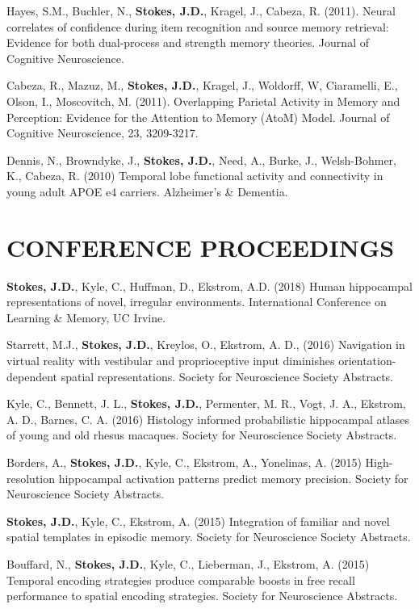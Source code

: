 \documentclass[line,margin,10pt]{res}
\begin{document}
\begin{resume}
Hayes, S.M., Buchler, N., \textbf{Stokes, J.D.}, Kragel, J., Cabeza, R. (2011). Neural correlates of confidence during item recognition and source memory retrieval: Evidence for both dual-process and strength memory theories. Journal of Cognitive Neuroscience.
	
Cabeza, R., Mazuz, M., \textbf{Stokes, J.D.}, Kragel, J., Woldorff, W, Ciaramelli, E., Olson, I., Moscovitch, M. (2011). Overlapping Parietal Activity in Memory and Perception: Evidence for the Attention to Memory (AtoM) Model. Journal of Cognitive Neuroscience, 23, 3209-3217.
	
Dennis, N., Browndyke, J., \textbf{Stokes, J.D.}, Need, A., Burke, J., Welsh-Bohmer, K., Cabeza, R. (2010) Temporal lobe functional activity and connectivity in young adult APOE e4 carriers. Alzheimer's \& Dementia.

\section{CONFERENCE PROCEEDINGS} 

\textbf{Stokes, J.D.}, Kyle, C., Huffman, D., Ekstrom, A.D. (2018) Human hippocampal representations of novel, irregular environments. International Conference on Learning \& Memory, UC Irvine.

Starrett, M.J., \textbf{Stokes, J.D.}, Kreylos, O., Ekstrom, A. D., (2016) Navigation in virtual reality with vestibular and proprioceptive input diminishes orientation-dependent spatial representations. Society for Neuroscience Society Abstracts.

Kyle, C., Bennett, J. L., \textbf{Stokes, J.D.}, Permenter, M. R., Vogt, J. A., Ekstrom, A. D., Barnes, C. A. (2016) Histology informed probabilistic hippocampal atlases of young and old rhesus macaques. Society for Neuroscience Society Abstracts.

Borders, A., \textbf{Stokes, J.D.}, Kyle, C., Ekstrom, A., Yonelinas, A. (2015) High-resolution hippocampal activation patterns predict memory precision. Society for Neuroscience Society Abstracts.

\textbf{Stokes, J.D.}, Kyle, C., Ekstrom, A. (2015) Integration of familiar and novel spatial templates in episodic memory. Society for Neuroscience Society Abstracts.

Bouffard, N., \textbf{Stokes, J.D.}, Kyle, C., Lieberman, J., Ekstrom, A. (2015) Temporal encoding strategies produce comparable boosts in free recall performance to spatial encoding strategies. Society for Neuroscience Abstracts.


\end{resume}
\end{document}
